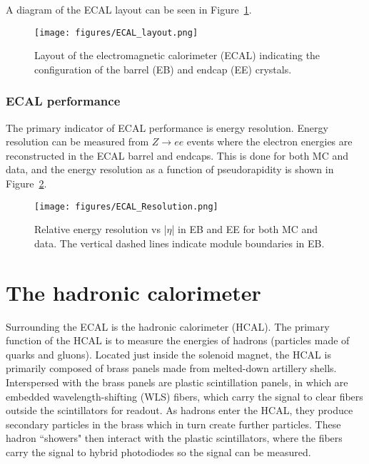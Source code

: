 A diagram of the ECAL layout can be seen in Figure~\ref{fig:ECAL_layout}.

\begin{figure}\centering
  \texttt{[image: figures/ECAL\_layout.png]}
  \caption{\label{fig:ECAL_layout} Layout of the electromagnetic calorimeter (ECAL) indicating the configuration of the barrel (EB) and endcap (EE) crystals.}
\end{figure}

\subsubsection{ECAL performance}

The primary indicator of ECAL performance is energy resolution. Energy resolution can be measured from $Z\to ee$ events where the electron energies are reconstructed in the ECAL barrel and endcaps. This is done for both MC and data, and the energy resolution as a function of pseudorapidity is shown in Figure~\ref{fig:ECAL_Resolution}. %

\begin{figure}\centering
  \texttt{[image: figures/ECAL\_Resolution.png]}
  \caption{\label{fig:ECAL_Resolution} Relative energy resolution vs |$\eta$| in EB and EE for both MC and data. The vertical dashed lines indicate module boundaries in EB.}
\end{figure}





\section{The hadronic calorimeter}

Surrounding the ECAL is the hadronic calorimeter (HCAL). The primary function of the HCAL is to measure the energies of hadrons (particles made of quarks and gluons). Located just inside the solenoid magnet, the HCAL is primarily composed of brass panels made from melted-down artillery shells. Interspersed with the brass panels are plastic scintillation panels, in which are embedded wavelength-shifting (WLS) fibers, which carry the signal to clear fibers outside the scintillators for readout. As hadrons enter the HCAL, they produce secondary particles in the brass which in turn create further particles. These hadron ``showers" then interact with the plastic scintillators, where the fibers carry the signal to hybrid photodiodes so the signal can be measured.

